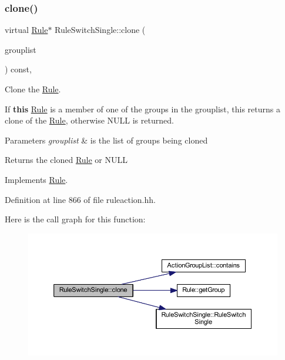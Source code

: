 \subsubsection{\texorpdfstring{clone()}{clone()}}
{\footnotesize\ttfamily virtual \mbox{\hyperlink{class_rule}{Rule}}$\ast$ Rule\+Switch\+Single\+::clone (\begin{DoxyParamCaption}\item[{const \mbox{\hyperlink{class_action_group_list}{Action\+Group\+List}} \&}]{grouplist }\end{DoxyParamCaption}) const\hspace{0.3cm}{\ttfamily [inline]}, {\ttfamily [virtual]}}



Clone the \mbox{\hyperlink{class_rule}{Rule}}. 

If {\bfseries{this}} \mbox{\hyperlink{class_rule}{Rule}} is a member of one of the groups in the grouplist, this returns a clone of the \mbox{\hyperlink{class_rule}{Rule}}, otherwise N\+U\+LL is returned. 
\begin{DoxyParams}{Parameters}
{\em grouplist} & is the list of groups being cloned \\
\hline
\end{DoxyParams}
\begin{DoxyReturn}{Returns}
the cloned \mbox{\hyperlink{class_rule}{Rule}} or N\+U\+LL 
\end{DoxyReturn}


Implements \mbox{\hyperlink{class_rule_a70de90a76461bfa7ea0b575ce3c11e4d}{Rule}}.



Definition at line 866 of file ruleaction.\+hh.

Here is the call graph for this function\+:
\nopagebreak
\begin{figure}[H]
\begin{center}
\leavevmode
\includegraphics[width=350pt]{class_rule_switch_single_ab260d5a864f7aa58bcaae9cd39050c23_cgraph}
\end{center}
\end{figure}
\mbox{\label{class_rule_switch_single_a75ce31e4e14853511c96a92141cf56d2}} 
